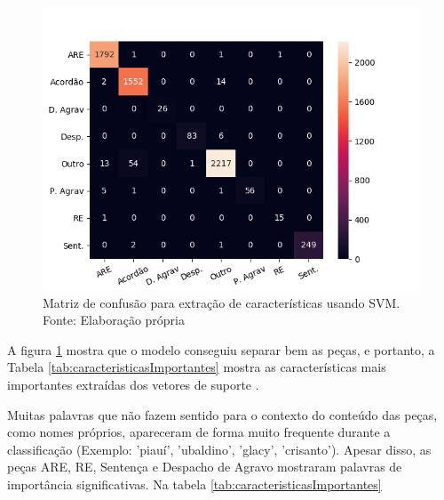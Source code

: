\begin{figure}
	\includegraphics[keepaspectratio=true,scale=0.5]{figuras/confusionMatrixSMV}
    \centering
	\caption[Matriz de confusão para extração de características usando SVM]{Matriz de confusão para extração de características usando SVM. Fonte: Elaboração própria}
	\label{fig:svmDisperssao}
\end{figure}

A figura \ref{fig:svmDisperssao} mostra que o modelo conseguiu separar bem as peças, e portanto, a Tabela \ref{tab:caracteristicasImportantes} mostra as características mais importantes extraídas dos vetores de suporte \cite{HEARST1995}.

Muitas palavras que não fazem sentido para o contexto do conteúdo das peças, como nomes próprios, apareceram de forma muito frequente durante a classificação (Exemplo: 'piauí', 'ubaldino', 'glacy', 'crisanto'). Apesar disso, as peças ARE, RE, Sentença e Despacho de Agravo mostraram palavras de importância significativas. Na tabela \ref{tab:caracteristicasImportantes}


